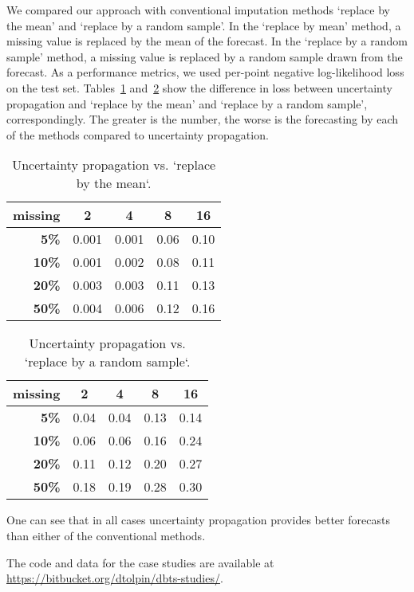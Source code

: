 \documentclass[runningheads]{llncs}
\begin{document}
We compared our approach with conventional imputation methods
`replace by the mean' and `replace by a random sample'.
In the `replace by mean' method, a missing value is replaced 
by the mean of the forecast. In the `replace by a random
sample' method, a missing value is replaced by a random sample
drawn from the forecast. As a performance metrics, we
used per-point negative log-likelihood loss on the test set. 
Tables~\ref{tab:replace-by-mean} and~\ref{tab:replace-by-sample}
show the difference in loss between uncertainty propagation and
`replace by the mean' and `replace by a random sample',
correspondingly. The greater is the number, the worse is the
forecasting by each of the methods compared to uncertainty
propagation.
\begin{table}[t]
\caption{Uncertainty propagation vs. `replace by the mean`.}
\label{tab:replace-by-mean}
	\setlength\tabcolsep{18pt}
	\centering
	\begin{tabular}{r|c c c c}
	 \textbf{missing} & \textbf{2} & \textbf{4} & \textbf{8} & \textbf{16} \\ \hline
		  \textbf{5\%} & 0.001 & 0.001 &  0.06 & 0.10  \\
		 \textbf{10\%} & 0.001 & 0.002 &  0.08 & 0.11  \\
		 \textbf{20\%} & 0.003 & 0.003 &  0.11 & 0.13  \\
		 \textbf{50\%} & 0.004 & 0.006 &  0.12 & 0.16  
	\end{tabular}
\end{table}
\begin{table}[t]
\caption{Uncertainty propagation vs. `replace by a random sample`.}
\vspace{1em}
\label{tab:replace-by-sample}
	\setlength\tabcolsep{18pt}
	\centering
	\begin{tabular}{r|c c c c}
	 \textbf{missing} & \textbf{2} & \textbf{4} & \textbf{8} & \textbf{16} \\ \hline
		  \textbf{5\%} & 0.04 & 0.04 & 0.13 & 0.14 \\
		 \textbf{10\%} & 0.06 & 0.06 & 0.16 & 0.24 \\
		 \textbf{20\%} & 0.11 & 0.12 & 0.20 & 0.27 \\
		 \textbf{50\%} & 0.18 & 0.19 & 0.28 & 0.30   
	\end{tabular}
\end{table}
One can see that in all cases uncertainty propagation provides
better forecasts than either of the conventional methods.

The code and data for the case studies are available at
\url{https://bitbucket.org/dtolpin/dbts-studies/}.
\end{document}
